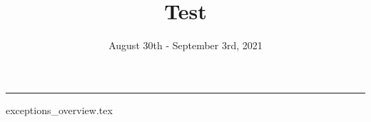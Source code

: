\documentclass{exam}
\title{Test}
\date{August 30th - September 3rd, 2021}
\begin{document}
\maketitle
\rule{\textwidth}{0.15em}
\fontsize{12}{15}\selectfont

{exceptions_overview.tex}
\end{document}

